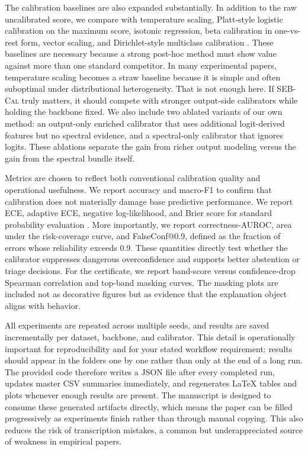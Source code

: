 \documentclass{article}
\newcommand{\method}{\textsc{SEB-Cal}}
\begin{document}
The calibration baselines are also expanded substantially. In addition to the raw uncalibrated score, we compare with temperature scaling, Platt-style logistic calibration on the maximum score, isotonic regression, beta calibration in one-vs-rest form, vector scaling, and Dirichlet-style multiclass calibration \cite{guo2017calibration,kull2017beta,kull2019dirichlet}. These baselines are necessary because a strong post-hoc method must show value against more than one standard competitor. In many experimental papers, temperature scaling becomes a straw baseline because it is simple and often suboptimal under distributional heterogeneity. That is not enough here. If \method{} truly matters, it should compete with stronger output-side calibrators while holding the backbone fixed. We also include two ablated variants of our own method: an output-only enriched calibrator that uses additional logit-derived features but no spectral evidence, and a spectral-only calibrator that ignores logits. These ablations separate the gain from richer output modeling versus the gain from the spectral bundle itself.

Metrics are chosen to reflect both conventional calibration quality and operational usefulness. We report accuracy and macro-F1 to confirm that calibration does not materially damage base predictive performance. We report ECE, adaptive ECE, negative log-likelihood, and Brier score for standard probability evaluation \cite{naeini2015obtaining,tao2023benchmark}. More importantly, we report correctness-AUROC, area under the risk-coverage curve, and FalseConf@0.9, defined as the fraction of errors whose reliability exceeds 0.9. These quantities directly test whether the calibrator suppresses dangerous overconfidence and supports better abstention or triage decisions. For the certificate, we report band-score versus confidence-drop Spearman correlation and top-band masking curves. The masking plots are included not as decorative figures but as evidence that the explanation object aligns with behavior.

All experiments are repeated across multiple seeds, and results are saved incrementally per dataset, backbone, and calibrator. This detail is operationally important for reproducibility and for your stated workflow requirement: results should appear in the folders one by one rather than only at the end of a long run. The provided code therefore writes a JSON file after every completed run, updates master CSV summaries immediately, and regenerates LaTeX tables and plots whenever enough results are present. The manuscript is designed to consume these generated artifacts directly, which means the paper can be filled progressively as experiments finish rather than through manual copying. This also reduces the risk of transcription mistakes, a common but underappreciated source of weakness in empirical papers.
\end{document}
